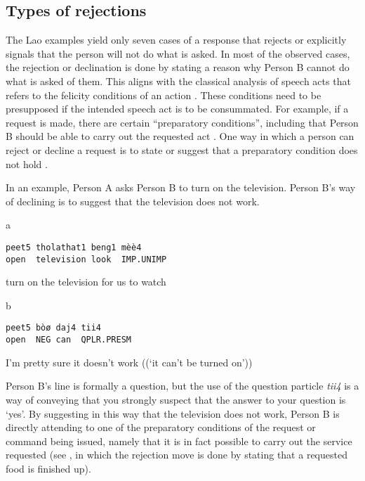 \documentclass[output=paper]{langsci/langscibook}
\begin{document}
\subsection{Types of rejections}

The Lao examples yield only seven cases of a response that rejects or explicitly signals that the person will not do what is asked. In most of the observed cases, the rejection or declination is done by stating a reason why Person B cannot do what is asked of them. This aligns with the classical analysis of speech acts that refers to the felicity conditions of an action \citep{austin_how_1962}. These conditions need to be presupposed if the intended speech act is to be consummated. For example, if a request is made, there are certain “preparatory conditions”, including that Person B should be able to carry out the requested act \citep[66]{Searle1969}. One way in which a person can reject or decline a request is to state or suggest that a preparatory condition does not hold \citep[87--88]{LabovFanshel1977}.

In an example, Person A asks Person B to turn on the television. Person B’s way of declining is to suggest that the television does not work.

\vspace{-1mm}
%
\begin{mdframednoverticalspace}[style=firstfoc]
\begin{transbox}{1}{a}
\begin{verbatim}
peet5 tholathat1 beng1 mèè4
open  television look  IMP.UNIMP
\end{verbatim}
turn on the television for us to watch
\end{transbox}
\end{mdframednoverticalspace}
%
\begin{mdframednoverticalspace}[style=secondfoc]
\begin{transbox}{2}{b}
\begin{verbatim}
peet5 bòø daj4 tii4
open  NEG can  QPLR.PRESM
\end{verbatim}
I’m pretty sure it doesn't work ((‘it can't be turned on’))
\end{transbox}
\end{mdframednoverticalspace}\bigskip

Person B’s line is formally a question, but the use of the question particle \textit{tii4} is a way of conveying that you strongly suspect that the answer to your question is ‘yes’. By suggesting in this way that the television does not work, Person B is directly attending to one of the preparatory conditions of the request or command being issued, namely that it is in fact possible to carry out the service requested (see , in which the rejection move is done by stating that a requested food is finished up). %
\end{document}
